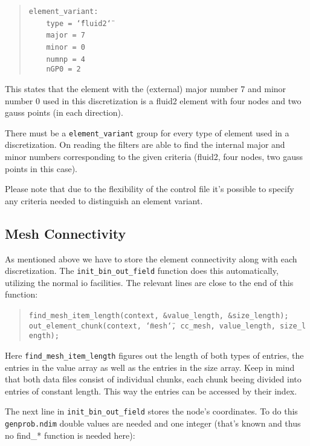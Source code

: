 \begin{quote}
\texttt{element{\_}variant:~}~\\
 \texttt{~~~~type~=~\char`\"{}fluid2\char`\"{}~}~\\
 \texttt{~~~~major~=~7~}~\\
 \texttt{~~~~minor~=~0~}~\\
 \texttt{~~~~numnp~=~4~}~\\
 \texttt{~~~~nGP0~=~2 }
\end{quote}
This states that the element with the (external) major number 7 and
minor number 0 used in this discretization is a fluid2 element with
four nodes and two gauss points (in each direction).

There must be a \texttt{element{\_}variant} group for every type
of element used in a discretization. On reading the filters are able
to find the internal major and minor numbers corresponding to the
given criteria (fluid2, four nodes, two gauss points in this case).

Please note that due to the flexibility of the control file it's possible
to specify any criteria needed to distinguish an element variant.


\subsection{Mesh Connectivity}

As mentioned above we have to store the element connectivity along
with each discretization. The \texttt{init{\_}bin{\_}out{\_}field}
function does this automatically, utilizing the normal io facilities.
The relevant lines are close to the end of this function: 

\begin{quote}
\texttt{find{\_}mesh{\_}item{\_}length(context,~{\&}value{\_}length,~{\&}size{\_}length);~}~\\
 \texttt{out{\_}element{\_}chunk(context,~\char`\"{}mesh\char`\"{},~cc{\_}mesh,~value{\_}length,~size{\_}length); }
\end{quote}
Here \texttt{find{\_}mesh{\_}item{\_}length} figures out the
length of both types of entries, the entries in the value array as
well as the entries in the size array. Keep in mind that both data
files consist of individual chunks, each chunk beeing divided into
entries of constant length. This way the entries can be accessed by
their index.

The next line in \texttt{init{\_}bin{\_}out{\_}field} stores
the node's coordinates. To do this \texttt{genprob.ndim} double values
are needed and one integer (that's known and thus no find{\_}{*}
function is needed here): 

